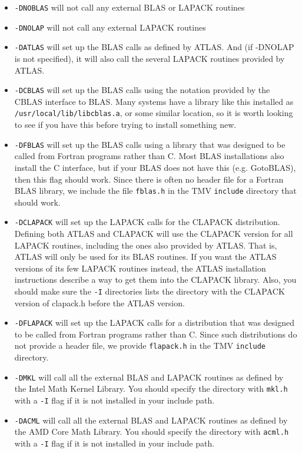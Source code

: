 \documentclass[twoside,letterpaper,11pt]{article}
\begin{document}
\begin{itemize}
\item
\texttt{-DNOBLAS} will not call any external BLAS or LAPACK routines
\item
\texttt{-DNOLAP} will not call any external LAPACK routines
\item
\texttt{-DATLAS} will set up the BLAS calls as defined by ATLAS.  And (if -DNOLAP
is not specified), it will also call the several LAPACK routines
provided by ATLAS.
\item
\texttt{-DCBLAS} will set up the BLAS calls using the notation provided by the 
CBLAS interface to BLAS.  Many systems have a library like this installed as 
\texttt{/usr/local/lib/libcblas.a}, or some similar location,
so it is worth looking to see if you have this before
trying to install something new.
\item
\texttt{-DFBLAS} will set up the BLAS calls using a library that was designed to be called
from Fortran programs rather than C.  
Most BLAS installations also install the C interface, but if your
BLAS does not have this (e.g. GotoBLAS), then this flag should work.  
Since there is often no
header file for a Fortran BLAS library, we include the file \texttt{fblas.h} in the TMV 
\texttt{include} directory that should work.
\item
\texttt{-DCLAPACK} will set up the LAPACK calls for the CLAPACK distribution.  
Defining both ATLAS and CLAPACK will use
the CLAPACK version for all LAPACK routines, including the ones also provided by 
ATLAS.  That is, ATLAS will only be used for its BLAS routines.  If you want
the ATLAS versions of its few LAPACK routines instead, the ATLAS 
installation instructions describe a way to get them into the CLAPACK library.
Also, you should make sure the \texttt{-I} directories lists the directory with the CLAPACK
version of clapack.h before the ATLAS version.
\item
\texttt{-DFLAPACK} will set up the LAPACK calls for a distribution that
was designed to be called from Fortran programs rather than C.  Since such distributions
do not provide a header file, we provide \texttt{flapack.h} in the TMV \texttt{include} directory.
\item
\texttt{-DMKL} will call all the external BLAS and LAPACK routines as defined by the
Intel Math Kernel Library.  You should specify the directory with \texttt{mkl.h} with a 
\texttt{-I} flag if it is not installed in your include path.
\item
\texttt{-DACML} will call all the external BLAS and LAPACK routines as defined by the 
AMD Core Math Library.  You should specify the directory with \texttt{acml.h} with a 
\texttt{-I} flag if it is not installed in your include path.
\end{itemize}
\end{document}
